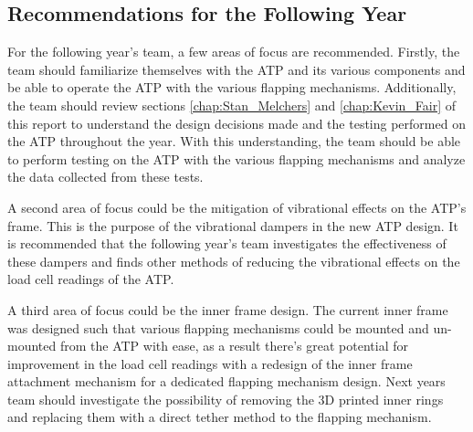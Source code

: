 \subsection{Recommendations for the Following Year}
For the following year's team, a few areas of focus are recommended. Firstly, the team should familiarize themselves with the ATP and its various components and be able to operate the ATP with the various flapping mechanisms. Additionally, the team should review sections \ref{chap:Stan_Melchers} and \ref{chap:Kevin_Fair} of this report to understand the design decisions made and the testing performed on the ATP throughout the year. With this understanding, the team should be able to perform testing on the ATP with the various flapping mechanisms and analyze the data collected from these tests.

A second area of focus could be the mitigation of vibrational effects on the ATP's frame. This is the purpose of the vibrational dampers in the new ATP design. It is recommended that the following year's team investigates the effectiveness of these dampers and finds other methods of reducing the vibrational effects on the load cell readings of the ATP.

A third area of focus could be the inner frame design. The current inner frame was designed such that various flapping mechanisms could be mounted and un-mounted from the ATP with ease, as a result there's great potential for improvement in the load cell readings with a redesign of the inner frame attachment mechanism for a dedicated flapping mechanism design. Next years team should investigate the possibility of removing the 3D printed inner rings and replacing them with a direct tether method to the flapping mechanism.
